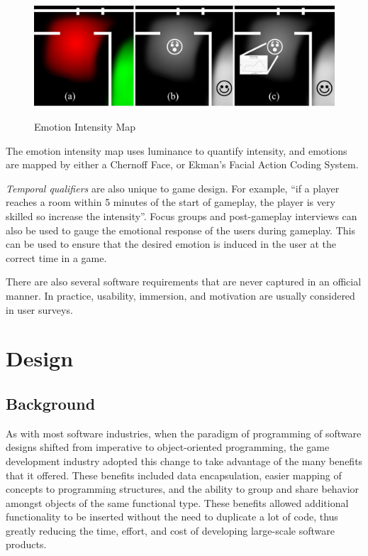 \begin{figure}[!ht]
	\includegraphics[scale=0.27]{Images/emotion_intensity_map}
	\label{emotion_intensity_map}
	\caption{Emotion Intensity Map \cite{callele2006emotional}}
\end{figure}

The emotion intensity map uses luminance to quantify intensity, and emotions are mapped by either a Chernoff Face\cite{flury1981graphical}, or Ekman's Facial Action Coding System\cite{ekman2002facial}.

\emph{Temporal qualifiers} are also unique to game design. For example, ``if a player reaches a room within 5 minutes of the start of gameplay, the player is very skilled so increase the intensity''\cite{callele2006emotional}. Focus groups and post-gameplay interviews can also be used to gauge the emotional response of the users during gameplay. This can be used to ensure that the desired emotion is induced in the user at the correct time in a game.

There are also several software requirements that are never captured in an official manner\cite{bentley2002putting}. In practice, usability, immersion, and motivation are usually considered in user surveys.

\section{Design}

\subsection{Background}
As with most software industries, when the paradigm of programming of software designs shifted from imperative to object-oriented programming, the game development industry adopted this change to take advantage of the many benefits that it offered. These benefits included data encapsulation, easier mapping of concepts to programming structures, and the ability to group and share behavior amongst objects of the same functional type. These benefits allowed additional functionality to be inserted without the need to duplicate a lot of code, thus greatly reducing the time, effort, and cost of developing large-scale software products.

